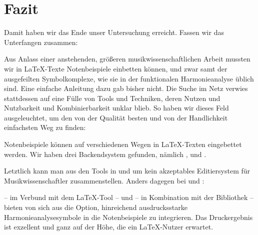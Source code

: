 %
%
%




\chapter{Fazit}

Damit haben wir das Ende unser Untersuchung erreicht. Fassen wir das Unterfangen
zusammen:

Aus Anlass einer anstehenden, größeren musikwissenschaftlichen Arbeit mussten
wir in \LaTeX-Texte Notenbeispiele einbetten können, und zwar samt der
ausgefeilten Symbolkomplexe, wie sie in der funktionalen Harmonieanalyse üblich
sind. Eine einfache Anleitung dazu gab bisher nicht. Die Suche im Netz verwies
stattdessen auf eine Fülle von Tools und Techniken, deren Nutzen und Nutzbarkeit
und Kombinierbarkeit unklar blieb. So haben wir dieses Feld ausgeleuchtet, um
den von der Qualität besten und von der Handlichkeit einfachsten Weg zu finden:

Notenbeispiele können auf verschiedenen Wegen in \LaTeX-Texten eingebettet
werden. Wir haben drei Backendsystem gefunden, nämlich
,  und
.

Letztlich kann man aus den Tools in und um  kein akzeptables
Editiersystem für Musikwissenschaftler zusammenstellen. Anders dagegen bei 
 und :

 -- im Verbund mit dem \LaTeX-Tool  --
und  -- in Kombination mit der 
Bibliothek  -- bieten von sich aus die Option, hinreichend
ausdrucksstarke Harmonieanalysesymbole in die Notenbeispiele zu integrieren.
Das Druckergebnis ist exzellent und ganz auf der Höhe, die ein \LaTeX-Nutzer
erwartet.

